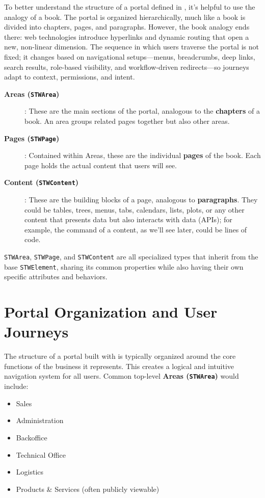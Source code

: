 To better understand the structure of a portal defined in \wbol{}, it's helpful to use the analogy of a book. The portal is organized hierarchically, much like a book is divided into chapters, pages, and paragraphs. However, the book analogy ends there: web technologies introduce hyperlinks and dynamic routing that open a new, non-linear dimension. The sequence in which users traverse the portal is not fixed; it changes based on navigational setups---menus, breadcrumbs, deep links, search results, role-based visibility, and workflow-driven redirects---so journeys adapt to context, permissions, and intent.

\begin{description}
\item[\textbf{Areas (\texttt{STWArea})}]: These are the main sections of the portal, analogous to the \textbf{chapters} of a book. An area groups related pages together but also other areas.
\item[\textbf{Pages (\texttt{STWPage})}]: Contained within Areas, these are the individual \textbf{pages} of the book. Each page holds the actual content that users will see.
\item[\textbf{Content (\texttt{STWContent})}]: These are the building blocks of a page, analogous to \textbf{paragraphs}. They could be tables, trees, menus, tabs, calendars, lists, plots, or any other content that presents data but also interacts with data (APIs); for example, the command of a content, as we'll see later, could be lines of code. 
\end{description}

	\texttt{STWArea}, \texttt{STWPage}, and \texttt{STWContent} are all specialized types that inherit from the base \texttt{STWElement}, sharing its common properties while also having their own specific attributes and behaviors.

\section{Portal Organization and User Journeys}
\label{sec:user-journeys}

The structure of a portal built with \wbol{} is typically organized around the core functions of the business it represents. This creates a logical and intuitive navigation system for all users. Common top-level \textbf{Areas (\texttt{STWArea})} would include:

\begin{itemize}
	\item Sales
	\item Administration
	\item Backoffice
	\item Technical Office
	\item Logistics
	\item Products \& Services (often publicly viewable)
\end{itemize}


